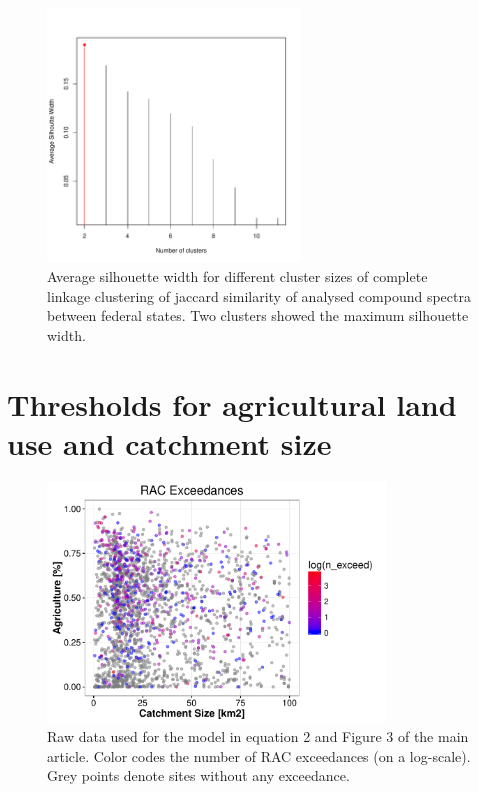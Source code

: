 \documentclass[pdftex,a4paper]{scrreprt}
\begin{document}
\begin{figure}[ht]
	\centering
	\includegraphics[width = 0.6\textwidth]{silhouette}
	\caption[Average silhouette width for different cluster sizes.]{Average silhouette width for different cluster sizes of complete linkage clustering of jaccard similarity of analysed compound spectra between federal states. Two clusters showed the maximum silhouette width.}
	\label{fig:silhouette}
\end{figure}

\newpage





\chapter{Thresholds for agricultural land use and catchment size}
\begin{figure}[ht]
	\centering
	\includegraphics[width = 0.8\textwidth]{ezgagrirac}
	\caption[Raw data used for the model in equation 2 and Figure 3 of the main article.]{Raw data used for the model in equation 2 and Figure 3 of the main article. Color codes the number of RAC exceedances (on a log-scale). Grey points denote sites without any exceedance.}
	\label{fig:ezgagrirac}
\end{figure}
\end{document}
